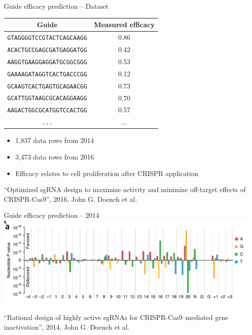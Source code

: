 \documentclass[Nike]{tuberlinbeamer}
\begin{document}
\begin{frame}{Guide efficacy prediction -- Dataset}
\begin{table}[]
    \centering
    \begin{tabular}{cc}
        \textbf{Guide} & \textbf{Measured efficacy} \\ \hline
\texttt{GTAGGGGTCCGTACTCAGCAAGG} & 0.86 \\
\texttt{ACACTGCCGAGCGATGAGGATGG} & 0.42 \\
\texttt{AAGGTGAAGGAGGATGCGGCGGG} & 0.53 \\
\texttt{GAAAAGATAGGTCACTGACCCGG} & 0.12 \\
\texttt{GCAAGTCACTGAGTGCAGAACGG} & 0.73 \\
\texttt{GCATTGGTAAGCGCACAGGAAGG} & 0.70 \\
\texttt{AAGACTGGCGCATGGTCCACTGG} & 0.57 \\
\texttt{...} & ... \\
    \end{tabular}
\end{table}
\begin{itemize}
  \item 1,837 data rows from 2014
  \item 3,473 data rows from 2016
  \item Efficacy relates to cell proliferation after CRISPR application
\end{itemize}
\begin{flushright}
  \tiny
  ``Optimized sgRNA design to maximize activity and minimize off-target effects of CRISPR-Cas9'', 2016, John G. Doench et al.\
\end{flushright}
\end{frame}

\begin{frame}{Guide efficacy prediction -- 2014}
  \includegraphics[width=\linewidth]{./nucleotide_table.png}
  \begin{flushright}
    \tiny
    ``Rational design of highly active sgRNAs for CRISPR-Cas9–mediated gene inactivation'', 2014, John G. Doench et al.\
  \end{flushright}
\end{frame}
\end{document}
